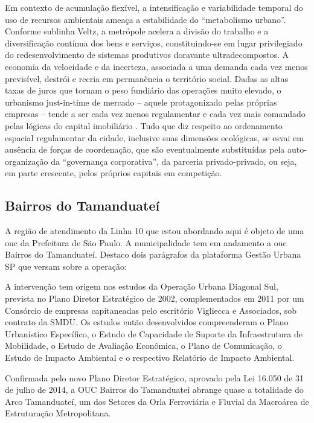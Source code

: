 	\begin{citacao}
		Em contexto de acumulação flexível, a intensificação e variabilidade temporal do uso de recursos ambientais ameaça a estabilidade do “metabolismo urbano”. Conforme sublinha Veltz, a metrópole acelera a divisão do trabalho e a diversificação contínua dos bens e serviços, constituindo-se em lugar privilegiado do redesenvolvimento de sistemas produtivos doravante ultradecompostos. A economia da velocidade e da incerteza, associada a uma demanda cada vez menos previsível, destrói e recria em permanência o território social. Dadas as altas taxas de juros que tornam o peso fundiário das operações muito elevado, o urbanismo just-in-time de mercado – aquele protagonizado pelas próprias empresas – tende a ser cada vez menos regulamentar e cada vez mais comandado pelas	lógicas do capital imobiliário . Tudo que diz respeito ao ordenamento espacial regulamentar da cidade, inclusive suas dimensões ecológicas, se esvai em ausência de forças de coordenação, que são eventualmente substituídas pela auto-organização da	“governança corporativa”, da parceria privado-privado, ou seja, em parte crescente, pelos próprios capitais em competição.
		\cite[pág. 31]{Acselrad}
	\end{citacao}
	
	\subsection{Bairros do Tamanduateí}

	A região de atendimento da Linha 10 que estou abordando aqui é objeto de uma \gls{ouc} da Prefeitura de São Paulo. A municipalidade tem em andamento a \gls{ouc} Bairros do Tamanduateí. Destaco dois parágrafos da plataforma Gestão Urbana SP que versam sobre a operação:
	
	\begin{citacao}
		A intervenção tem origem nos estudos da Operação Urbana Diagonal Sul, prevista no Plano Diretor Estratégico de 2002, complementados em 2011 por um Consórcio de empresas capitaneadas pelo escritório Vigliecca e Associados, sob contrato da SMDU. Os estudos então desenvolvidos compreenderam o Plano Urbanístico Específico, o Estudo de Capacidade de Suporte da Infraestrutura de Mobilidade, o Estudo de Avaliação Econômica, o Plano de Comunicação, o Estudo de Impacto Ambiental e o respectivo Relatório de Impacto Ambiental.
	
		Confirmada pelo novo Plano Diretor Estratégico, aprovado pela Lei 16.050 de 31 de julho de 2014, a OUC Bairros do Tamanduateí abrange quase a totalidade do Arco Tamanduateí, um dos Setores da Orla Ferroviária e Fluvial da Macroárea de Estruturação Metropolitana.
		\cite{smdu}
	\end{citacao}
	
